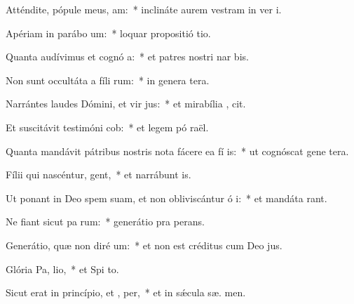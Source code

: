 \item Atténdite, pópule meus,  am:~* inclináte aurem vestram in ver  i.
\item Apériam in parábo  um:~* loquar propositió  tio.
\item Quanta audívimus et cognó a:~* et patres nostri nar bis.
\item Non sunt occultáta a fíli rum:~* in genera tera.
\item Narrántes laudes Dómini, et vir jus:~* et mirabília ,  cit.
\item Et suscitávit testimóni  cob:~* et legem pó  raël.
\item Quanta mandávit pátribus nostris nota fácere ea fí is:~* ut cognóscat gene tera.
\item Fílii qui nascéntur,  gent,~* et narrábunt  is.
\item Ut ponant in Deo spem suam, et non obliviscántur ó i:~* et mandáta  rant.
\item Ne fiant sicut pa rum:~* generátio pra  perans.
\item Generátio, quæ non diré  um:~* et non est créditus cum Deo  jus.
\item Glória Pa,  lio,~* et Spi to.
\item Sicut erat in princípio, et ,  per,~* et in sǽcula sæ. men.
